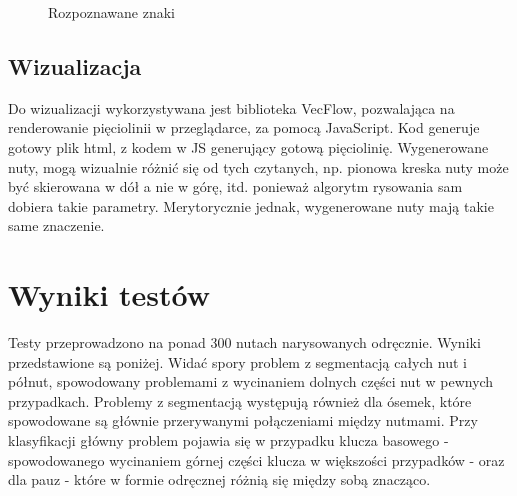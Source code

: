 \documentclass[a4paper,11pt]{article}
\begin{document}
\begin{figure}
{	\hspace*{16pt}
}\hfill
{}\hfill
{}\hfill
{}
\caption{Rozpoznawane znaki}
\label{fig:crops}
\end{figure}

\subsection{Wizualizacja}
Do wizualizacji wykorzystywana jest biblioteka VecFlow, pozwalająca na renderowanie pięciolinii w przeglądarce, za pomocą JavaScript.
Kod generuje gotowy plik html, z kodem w JS generujący gotową pięciolinię.
Wygenerowane nuty, mogą wizualnie różnić się od tych czytanych,
np. pionowa kreska nuty może być skierowana w dół a nie w górę, itd. ponieważ algorytm rysowania sam dobiera takie parametry.
Merytorycznie jednak, wygenerowane nuty mają takie same znaczenie.

\section{Wyniki testów}
Testy przeprowadzono na ponad 300 nutach narysowanych odręcznie. Wyniki przedstawione są poniżej.
Widać spory problem z segmentacją całych nut i półnut, spowodowany problemami z wycinaniem dolnych części nut w pewnych przypadkach.
Problemy z segmentacją występują również dla ósemek, które spowodowane są głównie przerywanymi połączeniami między nutmami.
Przy klasyfikacji główny problem pojawia się w przypadku klucza basowego - spowodowanego wycinaniem górnej części klucza w większości przypadków -
oraz dla pauz - które w formie odręcznej różnią się między sobą znacząco.
\end{document}
